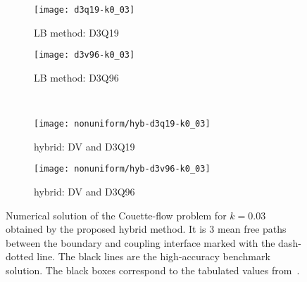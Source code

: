 \documentclass[]{elsarticle} %
\begin{document}
\begin{figure}
    \centering
    \begin{subfigure}[b]{0.5\textwidth}
        \texttt{[image: d3q19-k0\_03]}
        \caption{LB method: D3Q19}
        \label{fig:d3q19-k003}
    \end{subfigure}%
    \begin{subfigure}[b]{0.5\textwidth}
        \texttt{[image: d3v96-k0\_03]}
        \caption{LB method: D3Q96}
        \label{fig:d3v96-k003}
    \end{subfigure}\\
    \begin{subfigure}[b]{0.5\textwidth}
        \texttt{[image: nonuniform/hyb-d3q19-k0\_03]}
        \caption{hybrid: DV and D3Q19}
        \label{fig:hyb:d3q19-k003}
    \end{subfigure}%
    \begin{subfigure}[b]{0.5\textwidth}
        \texttt{[image: nonuniform/hyb-d3v96-k0\_03]}
        \caption{hybrid: DV and D3Q96}
        \label{fig:hyb:d3v96-k003}
    \end{subfigure}
    \caption{
        Numerical solution of the Couette-flow problem for \(k=0.03\) obtained by the proposed hybrid method.
        It is \(3\) mean free paths between the boundary and coupling interface marked with the dash-dotted line.
        The black lines are the high-accuracy benchmark solution.
        The black boxes correspond to the tabulated values from~\cite{Luo2016}.
    }\label{fig:hybrid-k003}
\end{figure}
\end{document}
